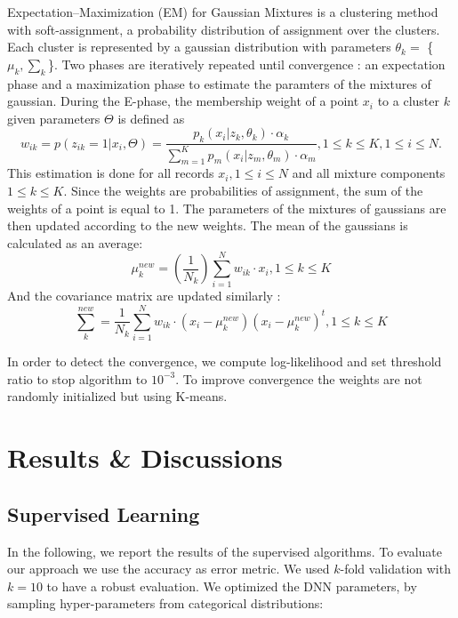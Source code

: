 \documentclass{llncs}
\begin{document}
Expectation–Maximization (EM) for Gaussian Mixtures is a clustering method with soft-assignment, a probability distribution of assignment over the clusters. 
Each cluster is represented by a gaussian distribution with parameters $\theta_{k}=$ \{$\mu_{k},\sum_{k}$\}.
Two phases are iteratively repeated until convergence : an expectation phase and a maximization phase to estimate the paramters of the mixtures of gaussian. 
During the E-phase, the membership weight of a point $x_{i}$ to a cluster $k$ given parameters $\Theta$ is defined as
\begin{equation}
w_{ik} = p(z_{ik} = 1|x_{i},\Theta)= \frac{p_{k}(x_{i}|z_{k},\theta_{k})\cdot \alpha_{k}}{\sum\limits_{m=1}^K p_{m}(x_{i}|z_{m},\theta_{m})\cdot \alpha_{m}}, 1\leq k\leq K, 1\leq i\leq N.
\end{equation}
This estimation is done for all records $x_{i}, 1\leq i\leq N$ and all mixture components $1\leq k\leq K$. Since the weights are probabilities of assignment, the sum of the weights of a point is equal to 1.
The parameters of the mixtures of gaussians are then updated according to the new weights. The mean of the gaussians is calculated as an average:
\begin{equation}
\mu_{k}^{new} = (\frac{1}{N_{k}}) \sum\limits_{i=1}^N w_{ik}\cdot x_{i}, 1\leq k \leq K
\end{equation}
And the covariance matrix are updated similarly :
\begin{equation}
\sum_{k}^{new} = \frac{1}{N_{k}} \sum\limits_{i=1}^N
 w_{ik} \cdot (x_{i} - \mu_{k}^{new})(x_{i}-\mu_{k}^{new})^{t}, 1\leq k \leq K \end{equation}

In order to detect the convergence, we compute log-likelihood and set threshold ratio to stop algorithm to $10^{-3}$. To improve convergence the weights are not randomly initialized but using K-means.  

\section{Results \& Discussions}

\subsection{Supervised Learning}

In the following, we report the results of the supervised algorithms. To evaluate our approach we use the accuracy as error metric. We used $k$-fold validation with $k=10$ to have a robust evaluation. 
We optimized the DNN parameters, by sampling hyper-parameters from categorical distributions:
\end{document}
